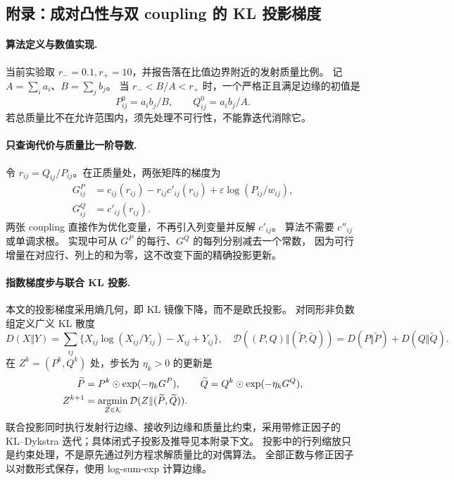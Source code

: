 \documentclass[UTF8,a4paper,11pt,fontset=fandol]{ctexart}
\begin{document}
\clearpage
\setcounter{equation}{0}
\renewcommand{\theequation}{D.\arabic{equation}}
\renewcommand{\theHequation}{D.\arabic{equation}}
\subsection*{附录：成对凸性与双 coupling 的 KL 投影梯度}

\paragraph{算法定义与数值实现.}
当前实验取 $r_-=0.1,r_+=10$，并报告落在比值边界附近的发射质量比例。
记 $A=\sum_i a_i$、$B=\sum_j b_j$。
当 $r_-<B/A<r_+$ 时，一个严格正且满足边缘的初值是
\begin{equation}
P^0_{ij}=a_i b_j/B,\qquad Q^0_{ij}=a_i b_j/A.
\end{equation}
若总质量比不在允许范围内，须先处理不可行性，不能靠迭代消除它。

\paragraph{只查询代价与质量比一阶导数.}
令 $r_{ij}=Q_{ij}/P_{ij}$。在正质量处，两张矩阵的梯度为
\begin{equation}
\boxed{\begin{aligned}
G^P_{ij}&=c_{ij}(r_{ij})-r_{ij}c'_{ij}(r_{ij})
+\varepsilon\log(P_{ij}/w_{ij}),\\
G^Q_{ij}&=c'_{ij}(r_{ij}).
\end{aligned}}
\label{eq:primal-gradients}
\end{equation}
两张 coupling 直接作为优化变量，不再引入列变量并反解 $c'_{ij}$。
算法不需要 $c''_{ij}$ 或单调求根。
实现中可从 $G^P$ 的每行、$G^Q$ 的每列分别减去一个常数，
因为可行增量在对应行、列上的和为零，这不改变下面的精确投影更新。

\paragraph{指数梯度步与联合 KL 投影.}
本文的投影梯度采用熵几何，即 KL 镜像下降，而不是欧氏投影。
对同形非负数组定义广义 KL 散度
\begin{equation}
D(X\Vert Y)=\sum_{ij}\{X_{ij}\log(X_{ij}/Y_{ij})-X_{ij}+Y_{ij}\},
\quad
\mathcal D((P,Q)\Vert(\widetilde P,\widetilde Q))
=D(P\Vert\widetilde P)+D(Q\Vert\widetilde Q).
\end{equation}
在 $Z^k=(P^k,Q^k)$ 处，步长为 $\eta_k>0$ 的更新是
\begin{equation}
\begin{aligned}
\widetilde P&=P^k\odot\exp(-\eta_kG^P),\qquad
\widetilde Q=Q^k\odot\exp(-\eta_kG^Q),\\
Z^{k+1}&=\mathop{\rm argmin}_{Z\in\mathcal K}
\mathcal D(Z\Vert(\widetilde P,\widetilde Q)).
\end{aligned}
\label{eq:kl-projected-step}
\end{equation}
联合投影同时执行发射行边缘、接收列边缘和质量比约束，采用带修正因子的
KL--Dykstra 迭代；具体闭式子投影及推导见本附录下文。
投影中的行列缩放只是约束处理，不是原先通过列方程求解质量比的对偶算法。
全部正数与修正因子以对数形式保存，使用 log-sum-exp 计算边缘。
\end{document}
